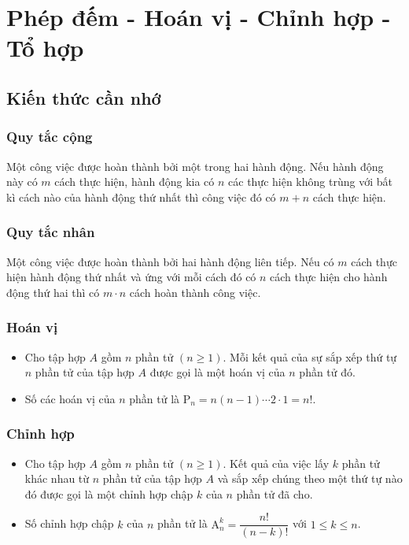 \setcounter{section}{21}
\setcounter{ex}{0}
\section{Phép đếm - Hoán vị - Chỉnh hợp - Tổ hợp}
\subsection{Kiến thức cần nhớ}
\begin{khung}
\subsubsection{Quy tắc cộng}
Một công việc được hoàn thành bởi một trong hai hành động. Nếu hành động này có $m$ cách thực hiện, hành động kia có $n$ các thực hiện không trùng với bất kì cách nào của hành động thứ nhất thì công việc đó có $m+n$ cách thực hiện.
\subsubsection{Quy tắc nhân}
Một công việc được hoàn thành bởi hai hành động liên tiếp. Nếu có $m$ cách thực hiện hành động thứ nhất và ứng với mỗi cách đó có $n$ cách thực hiện cho hành động thứ hai thì có $m\cdot n$ cách hoàn thành công việc.
\subsubsection{Hoán vị}
\begin{itemize}
	\item Cho tập hợp $A$ gồm $n$ phần tử $(n\geq 1)$. Mỗi kết quả của sự sắp xếp thứ tự $n$ phần tử của tập hợp $A$ được gọi là một hoán vị của $n$ phần tử đó.
	\item Số các hoán vị của $n$ phần tử là $\mathrm{P}_n=n(n-1)\cdots 2\cdot 1=n!$.
\end{itemize}
\subsubsection{Chỉnh hợp}
\begin{itemize}
	\item Cho tập hợp $A$ gồm $n$ phần tử $(n\geq 1)$.
	Kết quả của việc lấy $k$ phần tử khác nhau từ $n$ phần tử của tập hợp $A$ và sắp xếp chúng theo một thứ tự nào đó được gọi là một chỉnh hợp chập $k$ của $n$ phần tử đã cho.
	\item Số chỉnh hợp chập $k$ của $n$ phần tử là $\mathrm{A}^k_n=\dfrac{n!}{(n-k)!}$ với $1\leq k\leq n$.
\end{itemize}

\end{khung}
